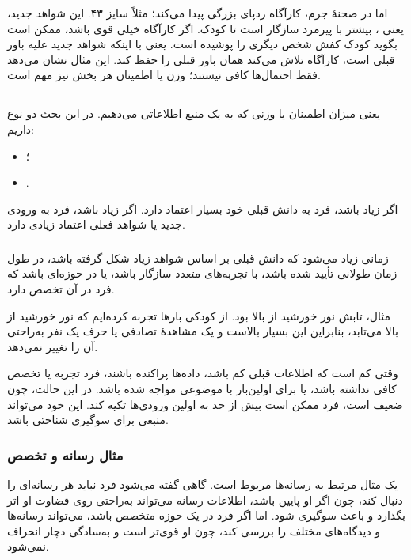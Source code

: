 اما در صحنهٔ جرم، کارآگاه ردپای بزرگی پیدا می‌کند؛ مثلاً سایز ۴۳. این شواهد جدید، یعنی ، بیشتر با پیرمرد سازگار است تا کودک. اگر  کارآگاه خیلی قوی باشد، ممکن است بگوید کودک کفش شخص دیگری را پوشیده است. یعنی با اینکه شواهد جدید علیه باور قبلی است، کارآگاه تلاش می‌کند همان باور قبلی را حفظ کند. این مثال نشان می‌دهد فقط احتمال‌ها کافی نیستند؛ وزن یا اطمینان هر بخش نیز مهم است.

\subsection{}
 یعنی میزان اطمینان یا وزنی که به یک منبع اطلاعاتی می‌دهیم. در این بحث دو نوع  داریم:
\begin{itemize}
  \item {}؛
  \item {}.
\end{itemize}

اگر  زیاد باشد، فرد به دانش قبلی خود بسیار اعتماد دارد. اگر  زیاد باشد، فرد به ورودی جدید یا شواهد فعلی اعتماد زیادی دارد.

\subsubsection{}
 زمانی زیاد می‌شود که دانش قبلی بر اساس شواهد زیاد شکل گرفته باشد، در طول زمان طولانی تأیید شده باشد، با تجربه‌های متعدد سازگار باشد، یا در حوزه‌ای باشد که فرد در آن تخصص دارد.

مثال، تابش نور خورشید از بالا بود. از کودکی بارها تجربه کرده‌ایم که نور خورشید از بالا می‌تابد، بنابراین  این  بسیار بالاست و یک مشاهدهٔ تصادفی یا حرف یک نفر به‌راحتی آن را تغییر نمی‌دهد.

 وقتی کم است که اطلاعات قبلی کم باشد، داده‌ها پراکنده باشند، فرد تجربه یا تخصص کافی نداشته باشد، یا برای اولین‌بار با موضوعی مواجه شده باشد. در این حالت، چون  ضعیف است، فرد ممکن است بیش از حد به اولین ورودی‌ها تکیه کند. این خود می‌تواند منبعی برای سوگیری شناختی باشد.

\subsubsection{مثال رسانه و تخصص}
یک مثال مرتبط به رسانه‌ها مربوط است. گاهی گفته می‌شود فرد نباید هر رسانه‌ای را دنبال کند، چون اگر  او پایین باشد، اطلاعات رسانه می‌تواند به‌راحتی روی قضاوت او اثر بگذارد و باعث سوگیری شود. اما اگر فرد در یک حوزه متخصص باشد، می‌تواند رسانه‌ها و دیدگاه‌های مختلف را بررسی کند، چون  او قوی‌تر است و به‌سادگی دچار انحراف نمی‌شود.

